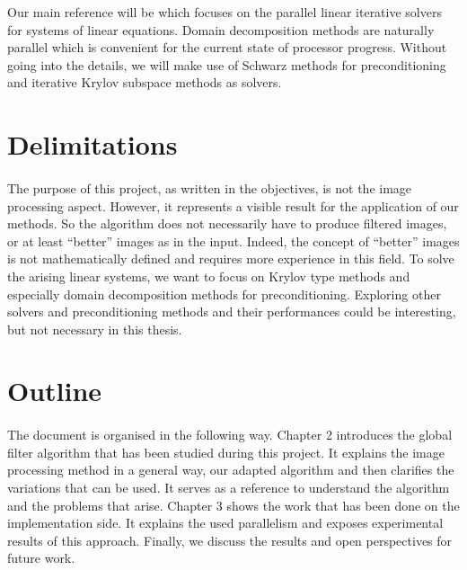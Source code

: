 Our main reference will be \cite{dolean_domain_2015} which focuses on the parallel linear iterative solvers for systems of linear equations.
Domain decomposition methods are naturally parallel which is convenient for the current state of processor progress.
Without going into the details, we will make use of Schwarz methods for preconditioning and iterative Krylov subspace methods as solvers.

\section{Delimitations}

\paragraph{}
The purpose of this project, as written in the objectives, is not the image processing aspect.
However, it represents a visible result for the application of our methods.
So the algorithm does not necessarily have to produce filtered images, or at least ``better'' images as in the input.
Indeed, the concept of ``better'' images is not mathematically defined and requires more experience in this field.
To solve the arising linear systems, we want to focus on Krylov type methods and especially domain decomposition methods for preconditioning.
Exploring other solvers and preconditioning methods and their performances could be interesting, but not necessary in this thesis.

\section{Outline}

\paragraph{}
The document is organised in the following way.
Chapter 2 introduces the global filter algorithm that has been studied during this project.
It explains the image processing method in a general way, our adapted algorithm and then clarifies the variations that can be used.
It serves as a reference to understand the algorithm and the problems that arise.
Chapter 3 shows the work that has been done on the implementation side.
It explains the used parallelism and exposes experimental results of this approach.
Finally, we discuss the results and open perspectives for future work.

